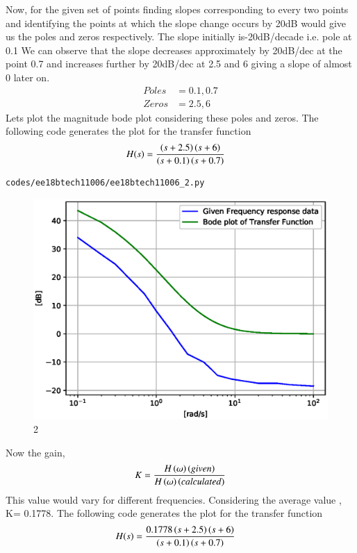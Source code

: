 Now, for the given set of points finding slopes corresponding to every two points and identifying the points at which the slope change occurs by 20dB would give us the poles and zeros respectively.
The slope initially is-20dB/decade i.e. pole at 0.1 
We can observe that the slope decreases approximately by 20dB/dec at the point 0.7 and increases further by 20dB/dec at 2.5 and 6 giving a slope of almost 0 later on. 
\begin{align}
Poles&= 0.1,0.7\\
Zeros&= 2.5,6
\end{align}
Lets plot the magnitude bode plot considering these poles and zeros.
The following code generates the plot for the transfer function
\begin{align}
H(s) &= \frac{\left(s+2.5\right)\left(s+6\right)}{\left(s+0.1\right)\left(s+0.7\right)}
\end{align}
\begin{lstlisting}
codes/ee18btech11006/ee18btech11006_2.py
\end{lstlisting}
\begin{figure}[!ht]
\centering
\includegraphics[width=\columnwidth]{./figs/ee18btech11006/ee18btech11006_2.eps}
\caption{2}
\label{fig:ee18btech11006_2}
\end{figure}
Now the gain,
\begin{align}
K=\frac{H\left(\omega\right)\left(given\right)}{H\left(\omega\right)\left(calculated\right)} 
\end{align}
This value would vary for different frequencies.
Considering the average value , K= 0.1778. 
The following code generates the plot for the transfer function
\begin{align}
H(s) &= \frac{0.1778\left(s+2.5\right)\left(s+6\right)}{\left(s+0.1\right)\left(s+0.7\right)} 
\end{align}
